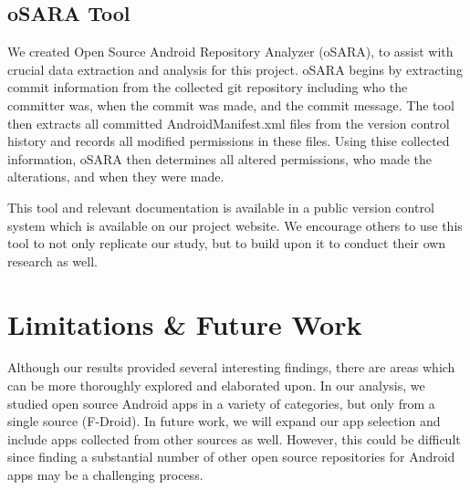 \documentclass{sig-alternate-05-2015}
\begin{document}
 \subsection{oSARA Tool}

We created Open Source Android Repository Analyzer (oSARA), to assist with crucial data extraction and analysis for this project. oSARA begins by extracting commit information from the collected git repository including who the committer was, when the commit was made, and the commit message. The tool then extracts all committed AndroidManifest.xml files from the version control history and records all modified permissions in these files. Using thise collected information, oSARA then determines all altered permissions, who made the alterations, and when they were made.

This tool and relevant documentation is available in a public version control system which is available on our project website. We encourage others to use this tool to not only replicate our study, but to build upon it to conduct their own research as well.



\vspace{7mm}
\section{Limitations \& Future Work}
\label{sec: futurework}


Although our results provided several interesting findings, there are areas which can be more thoroughly explored and elaborated upon. In our analysis, we studied open source Android apps in a variety of categories, but only from a single source (F-Droid). In future work, we will expand our app selection and include apps collected from other sources as well. However, this could be difficult since finding a substantial number of other open source repositories for Android apps may be a challenging process.
\end{document}
